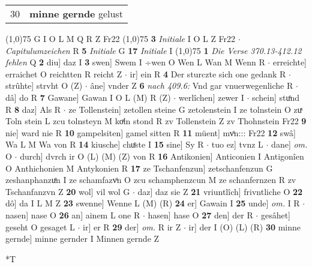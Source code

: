 \documentclass[8pt,a4paper,notitlepage]{article}
\begin{document}
\begin{table}[ht]
\begin{minipage}[t]{0.5\linewidth}
\begin{tabular}{rl}
30 & \textbf{minne gernde} gelust\\ 
\end{tabular}
\scriptsize
\line(1,0){75} \newline
G I O L M Q R Z Fr22 \newline
\line(1,0){75} \newline
\textbf{3} \textit{Initiale} I O L Z Fr22   $\cdot$ \textit{Capitulumzeichen} R  \textbf{5} \textit{Initiale} G  \textbf{17} \textit{Initiale} I  \newline
\line(1,0){75} \newline
\textbf{1} \textit{Die Verse 370.13-412.12 fehlen} Q  \textbf{2} diu] daz I \textbf{3} swen] Swem I ÷wen O Wen L Wan M Wenn R  $\cdot$ erreichte] erraichet O reichtten R reicht Z  $\cdot$ ir] ein R \textbf{4} Der sturczte sich one gedank R  $\cdot$ strûhte] strvht O (Z)  $\cdot$ âne] vnder Z \textbf{6} \textit{nach 409.6:} Vnd gar vnuerwegenliche R   $\cdot$ dâ] do R \textbf{7} Gawane] Gawan I O L (M) R (Z)  $\cdot$ werlîchen] zewer I  $\cdot$ schein] stuͦnd R \textbf{8} daz] Als R  $\cdot$ ze Tollenstein] zetollen steine G zetolenstein I ze tolnstein O zuͯ Toln stein L zcu tolnsteyn M koͯln stond R zv Tollenstein Z zv Thohnstein Fr22 \textbf{9} nie] ward nie R \textbf{10} gampelsiten] gamel sitten R \textbf{11} müent] mvͦn::: Fr22 \textbf{12} swâ] Wa L M Wa von R \textbf{14} kiusche] chuͤste I \textbf{15} sine] Sy R  $\cdot$ tuo ez] tvnz L  $\cdot$ dane] \textit{om.} O  $\cdot$ durch] dvrch ir O (L) (M) (Z) von R \textbf{16} Antikonien] Anticonien I Antigonîen O Anthichonien M Antykonien R \textbf{17} ze Tschanfenzun] zetschanfenzun G zeshanphanzuͤn I ze schamfazvͦn O zcu schamphenzcun M ze schanfernzen R zv Tschanfanzvn Z \textbf{20} wol] vil wol G  $\cdot$ daz] daz sie Z \textbf{21} vriuntlîch] frivntliche O \textbf{22} dô] da I L M Z \textbf{23} swenne] Wenne L (M) (R) \textbf{24} er] Gawain I \textbf{25} unde] \textit{om.} I R  $\cdot$ nasen] nase O \textbf{26} an] ainem L one R  $\cdot$ hasen] hase O \textbf{27} den] der R  $\cdot$ gesâhet] geseht O gesaget L  $\cdot$ ir] er R \textbf{29} der] \textit{om.} R ir Z  $\cdot$ ir] der I (O) (L) (R) \textbf{30} minne gernde] minne gernder I Minnen gernde Z \newline
\end{minipage}
\hspace{0.5cm}
\begin{minipage}[t]{0.5\linewidth}
\small
\begin{center}*T
\end{center}
\begin{tabular}{rl}

\end{tabular}
\end{minipage}
\end{table}
\end{document}
